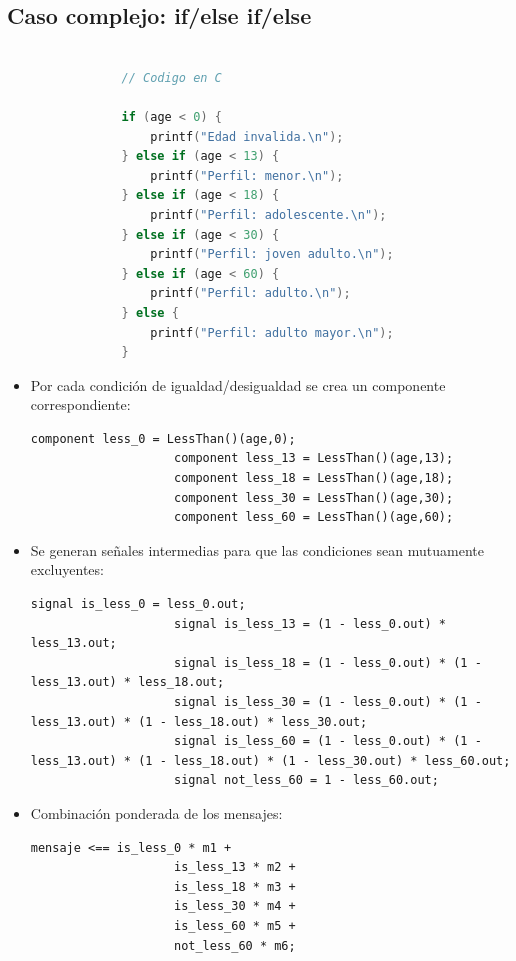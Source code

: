 \documentclass[a4paper,10pt]{article}
\begin{document}
		
		\subsection*{Caso complejo: if/else if/else}
			\begin{lstlisting}[language=C]
				
				// Codigo en C
				
				if (age < 0) {
					printf("Edad invalida.\n");
				} else if (age < 13) {
					printf("Perfil: menor.\n");
				} else if (age < 18) {
					printf("Perfil: adolescente.\n");
				} else if (age < 30) {
					printf("Perfil: joven adulto.\n");
				} else if (age < 60) {
					printf("Perfil: adulto.\n");
				} else {
					printf("Perfil: adulto mayor.\n");
				}
			\end{lstlisting}
			
			
			\begin{itemize}
				\item Por cada condición de igualdad/desigualdad se crea un componente correspondiente:
				\begin{lstlisting}[language=Circom]
					component less_0 = LessThan()(age,0);
					component less_13 = LessThan()(age,13);
					component less_18 = LessThan()(age,18);
					component less_30 = LessThan()(age,30);
					component less_60 = LessThan()(age,60);
				\end{lstlisting}
				
				\item Se generan señales intermedias para que las condiciones sean mutuamente excluyentes:
				\begin{lstlisting}[language=Circom]
					signal is_less_0 = less_0.out;
					signal is_less_13 = (1 - less_0.out) * less_13.out;
					signal is_less_18 = (1 - less_0.out) * (1 - less_13.out) * less_18.out;
					signal is_less_30 = (1 - less_0.out) * (1 - less_13.out) * (1 - less_18.out) * less_30.out;
					signal is_less_60 = (1 - less_0.out) * (1 - less_13.out) * (1 - less_18.out) * (1 - less_30.out) * less_60.out;
					signal not_less_60 = 1 - less_60.out;
				\end{lstlisting}
				
				\item Combinación ponderada de los mensajes:
				\begin{lstlisting}[language=Circom]
					mensaje <== is_less_0 * m1 +
					is_less_13 * m2 +
					is_less_18 * m3 +
					is_less_30 * m4 +
					is_less_60 * m5 +
					not_less_60 * m6;
				\end{lstlisting}
			\end{itemize}
			
\end{document}
